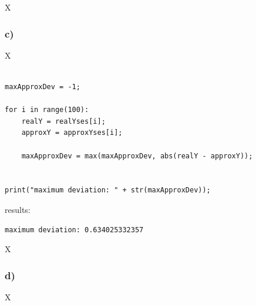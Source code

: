 X



\subsubsection{c)}

X

\begin{lstlisting}[caption=todo]

maxApproxDev = -1;

for i in range(100):
	realY = realYses[i];
	approxY = approxYses[i];
	
	maxApproxDev = max(maxApproxDev, abs(realY - approxY));


print("maximum deviation: " + str(maxApproxDev));

\end{lstlisting}


results:

\begin{lstlisting}[caption=Result of 1.1 a), keywordstyle=\color{black}]
maximum deviation: 0.634025332357
\end{lstlisting}

X



\subsubsection{d)}

X

